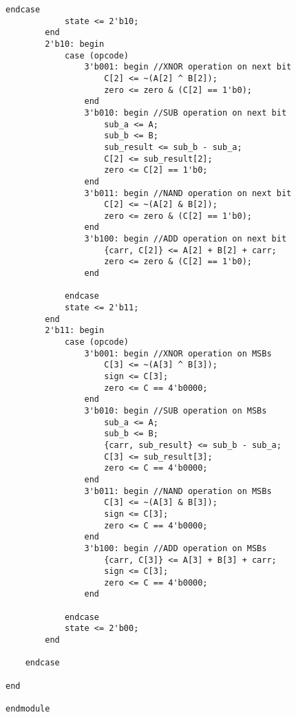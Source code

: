 \begin{lstlisting}[style=verilogStyle, caption={Verilog code for 4-bit ALU},label={lst: Verilog HDL Code for 4-bit ALU}]
            endcase
            state <= 2'b10;
        end
        2'b10: begin
            case (opcode)
                3'b001: begin //XNOR operation on next bit
                    C[2] <= ~(A[2] ^ B[2]);
                    zero <= zero & (C[2] == 1'b0);
                end
                3'b010: begin //SUB operation on next bit
                    sub_a <= A;
                    sub_b <= B;
                    sub_result <= sub_b - sub_a;
                    C[2] <= sub_result[2];
                    zero <= C[2] == 1'b0;
                end
                3'b011: begin //NAND operation on next bit
                    C[2] <= ~(A[2] & B[2]);
                    zero <= zero & (C[2] == 1'b0);
                end
                3'b100: begin //ADD operation on next bit
                    {carr, C[2]} <= A[2] + B[2] + carr;
                    zero <= zero & (C[2] == 1'b0);
                end

            endcase
            state <= 2'b11;
        end
        2'b11: begin
            case (opcode)
                3'b001: begin //XNOR operation on MSBs
                    C[3] <= ~(A[3] ^ B[3]);
                    sign <= C[3];
                    zero <= C == 4'b0000;
                end
                3'b010: begin //SUB operation on MSBs
                    sub_a <= A;
                    sub_b <= B;
                    {carr, sub_result} <= sub_b - sub_a;
                    C[3] <= sub_result[3];
                    zero <= C == 4'b0000;
                end
                3'b011: begin //NAND operation on MSBs
                    C[3] <= ~(A[3] & B[3]);
                    sign <= C[3];
                    zero <= C == 4'b0000;
                end
                3'b100: begin //ADD operation on MSBs
                    {carr, C[3]} <= A[3] + B[3] + carr;
                    sign <= C[3];
                    zero <= C == 4'b0000;
                end

            endcase
            state <= 2'b00;
        end

    endcase

end

endmodule
\end{lstlisting}
